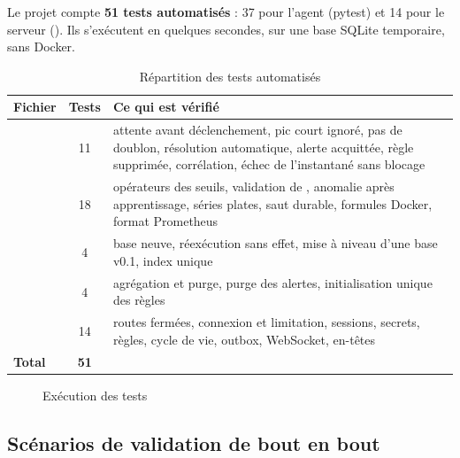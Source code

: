 Le projet compte \textbf{51 tests automatisés} : 37 pour l'agent (pytest) et 14 pour le
serveur (). Ils s'exécutent en quelques secondes, sur une base SQLite
temporaire, sans Docker.

\begin{table}[htbp]
\centering
\small
\begin{tabularx}{\linewidth}{L{4.4cm}cY}
\toprule
\textbf{Fichier} & \textbf{Tests} & \textbf{Ce qui est vérifié} \\
\midrule
{} & 11 & attente avant déclenchement, pic court ignoré, pas de doublon, résolution automatique, alerte acquittée, règle supprimée, corrélation, échec de l'instantané sans blocage \\
 & 18 & opérateurs des seuils, validation de , anomalie après apprentissage, séries plates, saut durable, formules Docker, format Prometheus \\
 & 4 & base neuve, réexécution sans effet, mise à niveau d'une base v0.1, index unique \\
 & 4 & agrégation et purge, purge des alertes, initialisation unique des règles \\
 & 14 & routes fermées, connexion et limitation, sessions, secrets, règles, cycle de vie, outbox, WebSocket, en-têtes \\
\midrule
\textbf{Total} & \textbf{51} & \\
\bottomrule
\end{tabularx}
\caption{Répartition des tests automatisés}
\label{tab:tests}
\end{table}

\begin{figure}[htbp]
\centering
{}\hfill
{}
\caption{Exécution des tests}
\label{fig:tests}
\end{figure}

\subsection{Scénarios de validation de bout en bout}

